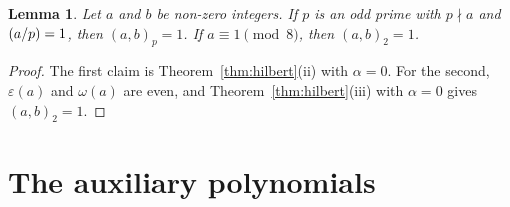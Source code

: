 \documentclass[11pt]{article}
\newtheorem{lemma}[theorem]{Lemma}
\newcommand{\leg}[2]{\mathchoice{\biggl(\dfrac{#1}{#2}\biggr)}{(#1/#2)}{(#1/#2)}{(#1/#2)}}
\begin{document}
\begin{lemma}\label{lem:square}
Let $a$ and $b$ be non-zero integers. If $p$ is an odd prime with $p\nmid a$ and $\leg{a}{p}=1$, then $(a,b)_p=1$. If $a\equiv1\pmod8$, then $(a,b)_2=1$.
\end{lemma}

\begin{proof}
The first claim is Theorem~\ref{thm:hilbert}(ii) with $\alpha=0$. For the second, $\varepsilon(a)$ and $\omega(a)$ are even, and Theorem~\ref{thm:hilbert}(iii) with $\alpha=0$ gives $(a,b)_2=1$.
\end{proof}

\section{The auxiliary polynomials}
\end{document}
